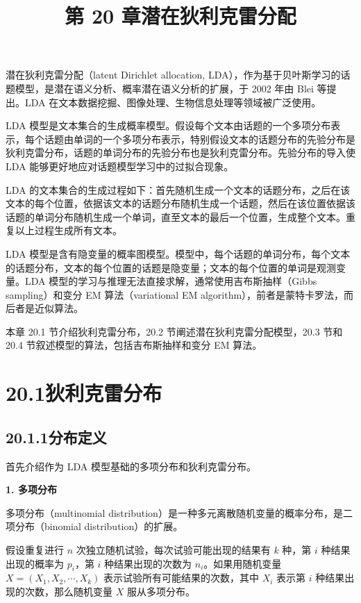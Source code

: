 \documentclass[UTF8, 12pt, fontset=fandol, oneside]{ctexart}
\title{第 20 章\quad 潜在狄利克雷分配}
\author{}
\date{}
\begin{document}
\maketitle

潜在狄利克雷分配（latent Dirichlet allocation, LDA），作为基于贝叶斯学习的话题模型，是潜在语义分析、概率潜在语义分析的扩展，于 2002 年由 Blei 等提出。LDA 在文本数据挖掘、图像处理、生物信息处理等领域被广泛使用。

LDA 模型是文本集合的生成概率模型。假设每个文本由话题的一个多项分布表示，每个话题由单词的一个多项分布表示，特别假设文本的话题分布的先验分布是狄利克雷分布，话题的单词分布的先验分布也是狄利克雷分布。先验分布的导入使 LDA 能够更好地应对话题模型学习中的过拟合现象。

LDA 的文本集合的生成过程如下：首先随机生成一个文本的话题分布，之后在该文本的每个位置，依据该文本的话题分布随机生成一个话题，然后在该位置依据该话题的单词分布随机生成一个单词，直至文本的最后一个位置，生成整个文本。重复以上过程生成所有文本。

LDA 模型是含有隐变量的概率图模型。模型中，每个话题的单词分布，每个文本的话题分布，文本的每个位置的话题是隐变量；文本的每个位置的单词是观测变量。LDA 模型的学习与推理无法直接求解，通常使用吉布斯抽样（Gibbs sampling）和变分 EM 算法（variational EM algorithm），前者是蒙特卡罗法，而后者是近似算法。

本章 20.1 节介绍狄利克雷分布，20.2 节阐述潜在狄利克雷分配模型，20.3 节和 20.4 节叙述模型的算法，包括吉布斯抽样和变分 EM 算法。

\section*{20.1\quad 狄利克雷分布}

\subsection*{20.1.1\quad 分布定义}

首先介绍作为 LDA 模型基础的多项分布和狄利克雷分布。

\noindent\textbf{1. 多项分布}

多项分布（multinomial distribution）是一种多元离散随机变量的概率分布，是二项分布（binomial distribution）的扩展。

假设重复进行 $n$ 次独立随机试验，每次试验可能出现的结果有 $k$ 种，第 $i$ 种结果出现的概率为 $p_i$，第 $i$ 种结果出现的次数为 $n_i$。如果用随机变量 $X=(X_1,X_2,\cdots,X_k)$ 表示试验所有可能结果的次数，其中 $X_i$ 表示第 $i$ 种结果出现的次数，那么随机变量 $X$ 服从多项分布。
\end{document}

